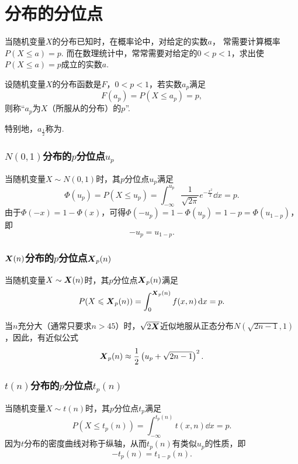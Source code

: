 \section{分布的分位点}
当随机变量\(X\)的分布已知时，在概率论中，对给定的实数\(a\)，%
常需要计算概率\(P(X \leqslant a) = p\).
而在数理统计中，常常需要对给定的\(0<p<1\)，求出使\(P(X \leqslant a) = p\)成立的实数\(a\).

\begin{definition}
设随机变量\(X\)的分布函数是\(F\)，\(0<p<1\)，若实数\(a_p\)满足\[
F(a_p) = P(X \leqslant a_p) = p,
\]则称“\(a_p\)为\(X\)（所服从的分布）的\(p\)”.

特别地，\(a_{\frac{1}{2}}\)称为.
\end{definition}

\subsubsection{\texorpdfstring{\(N(0,1)\)分布的\(p\)分位点\(u_p\)}{标准正态分布的p分位点}}
当随机变量\(X \sim N(0,1)\)时，其\(p\)分位点\(u_p\)满足\[
\Phi(u_p)
= P(X \leqslant u_p)
= \int_{-\infty}^{u_p} \frac{1}{\sqrt{2\pi}} e^{-\frac{x^2}{2}} \dd{x}
= p.
\]由于\(\Phi(-x)=1-\Phi(x)\)，可得\(\Phi(-u_p)=1-\Phi(u_p)=1-p=\Phi(u_{1-p})\)，即\begin{equation}
-u_p=u_{1-p}.
\end{equation}

\subsubsection{\texorpdfstring{\(\boldsymbol{X}(n)\)分布的\(p\)分位点\(\boldsymbol{X}_p(n)\)}{卡方分布的p分位点}}
当随机变量\(X \sim \boldsymbol{X}(n)\)时，其\(p\)分位点\(\boldsymbol{X}_p(n)\)满足\[
P(X \leqslant \boldsymbol{X}_p(n)) = \int_0^{\boldsymbol{X}_p(n)} f(x,n) \dd{x} = p.
\]

当\(n\)充分大（通常只要求\(n>45\)）时，\(\sqrt{2\boldsymbol{X}}\)近似地服从正态分布\(N(\sqrt{2n-1},1)\)，因此，有近似公式\begin{equation}
\boldsymbol{X}_p(n) \approx \frac{1}{2}\left(u_p+\sqrt{2n-1}\right)^2.
\end{equation}

\subsubsection{\texorpdfstring{\(t(n)\)分布的\(p\)分位点\(t_p(n)\)}{t分布的p分位点}}
当随机变量\(X \sim t(n)\)时，其\(p\)分位点\(t_p\)满足\[
P(X \leqslant t_p(n))
= \int_{-\infty}^{t_p(n)} t(x,n) \dd{x} = p.
\]因为\(t\)分布的密度曲线对称于纵轴，从而\(t_p(n)\)有类似\(u_p\)的性质，即\begin{equation}
-t_p(n)=t_{1-p}(n).
\end{equation}

